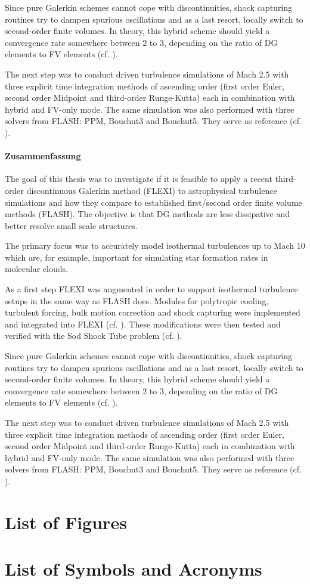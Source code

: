 Since pure Galerkin schemes cannot cope with discontinuities, shock
capturing routines try to dampen spurious oscillations and as a last resort,
locally switch to second-order finite volumes. In theory, this hybrid scheme
should yield a convergence rate somewhere between 2 to 3, depending on the
ratio of DG elements to FV elements (cf. ).

The next step was to conduct driven turbulence simulations of Mach 2.5 with
three explicit time integration methods of ascending order (first order Euler,
second order Midpoint and third-order Runge-Kutta) each in combination with
hybrid and FV-only mode. The same simulation was also performed with three
solvers from FLASH: PPM, Bouchut3 and Bouchut5. They serve as reference
(cf. ).

\paragraph{Zusammenfassung}

The goal of this thesis was to investigate if it is feasible to apply a
recent third-order discontinuous Galerkin method (FLEXI) to astrophysical
turbulence simulations and how they compare to established first/second order
finite volume methods (FLASH). The objective is that DG methods are less
dissipative and better resolve small scale structures.

The primary focus was to accurately model isothermal turbulences up to Mach 10
which are, for example, important for simulating star formation rates in
molecular clouds.

As a first step FLEXI was augmented in order to support isothermal turbulence
setups in the same way as FLASH does. Modules for polytropic cooling, turbulent
forcing, bulk motion correction and shock capturing were implemented and
integrated into FLEXI (cf. ). These
modifications were then tested and verified with the Sod Shock Tube problem
(cf. ).

Since pure Galerkin schemes cannot cope with discontinuities, shock
capturing routines try to dampen spurious oscillations and as a last resort,
locally switch to second-order finite volumes. In theory, this hybrid scheme
should yield a convergence rate somewhere between 2 to 3, depending on the
ratio of DG elements to FV elements (cf. ).

The next step was to conduct driven turbulence simulations of Mach 2.5 with
three explicit time integration methods of ascending order (first order Euler,
second order Midpoint and third-order Runge-Kutta) each in combination with
hybrid and FV-only mode. The same simulation was also performed with three
solvers from FLASH: PPM, Bouchut3 and Bouchut5. They serve as reference
(cf. ).

\newpage

\section*{List of Figures}

\section*{List of Symbols and Acronyms}

\newpage


